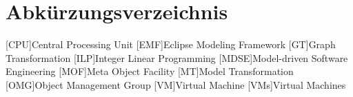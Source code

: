 
\section*{Abkürzungsverzeichnis}
\label{sec:list-of-abbreviations}

\begin{acronym}[AAAAAA] %
	[CPU]{Central Processing Unit}
	[EMF]{Eclipse Modeling Framework}
	[GT]{Graph Transformation}
	[ILP]{Integer Linear Programming}
	[MDSE]{Model-driven Software Engineering}
	[MOF]{Meta Object Facility}
	[MT]{Model Transformation}
	[OMG]{Object Management Group}
	[VM]{Virtual Machine}
	[VMs]{Virtual Machines}
\end{acronym}
